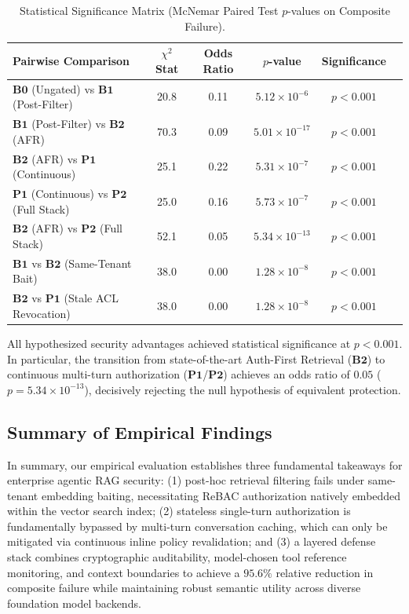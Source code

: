 \begin{table}[h]
\caption{Statistical Significance Matrix (McNemar Paired Test $p$-values on Composite Failure).}
\label{tab:statistical_tests}
\centering
\small
\begin{tabular}{lccccc}
\hline
\textbf{Pairwise Comparison} & $\chi^2$ \textbf{Stat} & \textbf{Odds Ratio} & $p$\textbf{-value} & \textbf{Significance} \\
\hline
$\mathbf{B0}$ (Ungated) vs $\mathbf{B1}$ (Post-Filter) & 20.8 & 0.11 & $5.12 \times 10^{-6}$ & $p < 0.001$ \\
$\mathbf{B1}$ (Post-Filter) vs $\mathbf{B2}$ (AFR) & 70.3 & 0.09 & $5.01 \times 10^{-17}$ & $p < 0.001$ \\
$\mathbf{B2}$ (AFR) vs $\mathbf{P1}$ (Continuous) & 25.1 & 0.22 & $5.31 \times 10^{-7}$ & $p < 0.001$ \\
$\mathbf{P1}$ (Continuous) vs $\mathbf{P2}$ (Full Stack) & 25.0 & 0.16 & $5.73 \times 10^{-7}$ & $p < 0.001$ \\
$\mathbf{B2}$ (AFR) vs $\mathbf{P2}$ (Full Stack) & 52.1 & 0.05 & $5.34 \times 10^{-13}$ & $p < 0.001$ \\
$\mathbf{B1}$ vs $\mathbf{B2}$ (Same-Tenant Bait) & 38.0 & 0.00 & $1.28 \times 10^{-8}$ & $p < 0.001$ \\
$\mathbf{B2}$ vs $\mathbf{P1}$ (Stale ACL Revocation) & 38.0 & 0.00 & $1.28 \times 10^{-8}$ & $p < 0.001$ \\
\hline
\end{tabular}
\end{table}

All hypothesized security advantages achieved statistical significance at $p < 0.001$. In particular, the transition from state-of-the-art Auth-First Retrieval ($\mathbf{B2}$) to continuous multi-turn authorization ($\mathbf{P1}$/$\mathbf{P2}$) achieves an odds ratio of $0.05$ ($p = 5.34 \times 10^{-13}$), decisively rejecting the null hypothesis of equivalent protection.

\subsection{Summary of Empirical Findings}
\label{sec:results:summary}

In summary, our empirical evaluation establishes three fundamental takeaways for enterprise agentic RAG security: (1) post-hoc retrieval filtering fails under same-tenant embedding baiting, necessitating ReBAC authorization natively embedded within the vector search index; (2) stateless single-turn authorization is fundamentally bypassed by multi-turn conversation caching, which can only be mitigated via continuous inline policy revalidation; and (3) a layered defense stack combines cryptographic auditability, model-chosen tool reference monitoring, and context boundaries to achieve a $95.6\%$ relative reduction in composite failure while maintaining robust semantic utility across diverse foundation model backends.
